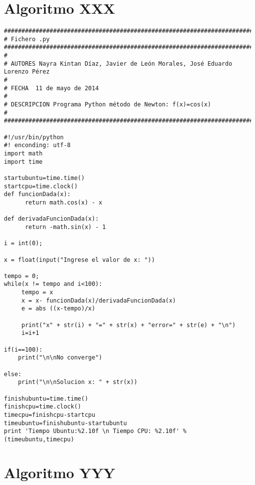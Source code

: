 \section{Algoritmo XXX}
\label{Apendice1:XXX}

\begin{center}
\begin{footnotesize}
\begin{verbatim}
###################################################################################
# Fichero .py
###################################################################################
#
# AUTORES Nayra Kintan Díaz, Javier de León Morales, José Eduardo Lorenzo Pérez
#   
# FECHA  11 de mayo de 2014
#
# DESCRIPCION Programa Python método de Newton: f(x)=cos(x)
#
###################################################################################

#!/usr/bin/python
#! enconding: utf-8
import math
import time

startubuntu=time.time()
startcpu=time.clock()
def funcionDada(x):
      return math.cos(x) - x

def derivadaFuncionDada(x):
      return -math.sin(x) - 1

i = int(0);

x = float(input("Ingrese el valor de x: "))

tempo = 0;
while(x != tempo and i<100):
     tempo = x
     x = x- funcionDada(x)/derivadaFuncionDada(x)
     e = abs ((x-tempo)/x)

     print("x" + str(i) + "=" + str(x) + "error=" + str(e) + "\n")
     i=i+1

if(i==100):
    print("\n\nNo converge")

else:
    print("\n\nSolucion x: " + str(x))
    
finishubuntu=time.time()
finishcpu=time.clock()
timecpu=finishcpu-startcpu
timeubuntu=finishubuntu-startubuntu
print 'Tiempo Ubuntu:%2.10f \n Tiempo CPU: %2.10f' %(timeubuntu,timecpu)
\end{verbatim}
\end{footnotesize}
\end{center}

\section{Algoritmo YYY}
\label{Apendice1:YYY}

